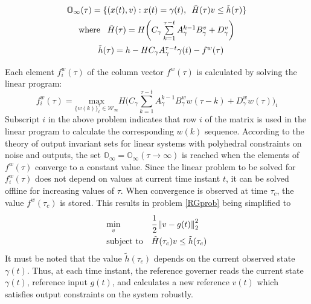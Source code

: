 \documentclass[letterpaper, 10 pt, conference]{ieeeconf}  %
\newcommand{\norm}[1]{\left\lVert#1\right\rVert}
\begin{document}
\begin{enumerate}
\begin{equation*}
	\begin{matrix}
	\mathbb{O}_{\infty}(\tau) = \{(x(t),v): x(t) = \gamma(t), \hspace{5pt} \tilde{H}(\tau)v \leq \tilde{h}(\tau)\} \vspace{5pt}\\
	\text{where } \hspace{5pt} \tilde{H}(\tau) = H\bigg( C_{\gamma}\sum\limits_{k=1}^{\tau - t}A_{\gamma}^{k-1}B^v_{\gamma} + D_{\gamma}^v \bigg) \vspace{5pt} \\ \hspace{10pt}
	\tilde{h}(\tau) = h - HC_{\gamma}A_{\gamma}^{\tau - t}\gamma(t) - f^w(\tau) \vspace{5pt}
	\end{matrix} 
	\end{equation*}
	Each element $f^w_i(\tau)$ of the column vector $f^w(\tau)$ is calculated by solving the linear program:
	\begin{equation}
	f_i^w(\tau) = \underset{\{w(k)\}_{t}^{\tau}\in \mathcal{W}_{\infty}}{\text{max}} H\bigg(C_{\gamma}\sum\limits_{k=1}^{\tau - t}A_{\gamma}^{k-1}B^w_{\gamma}w(\tau-k) + D_{\gamma}^w w(\tau)\bigg)_i
	\label{RG_offline}
	\end{equation}
	Subscript $i$ in the above problem indicates that row $i$ of the matrix is used in the linear program to calculate the corresponding $w(k)$ sequence. According to the theory of output invariant sets for linear systems with polyhedral constraints on noise and outputs, the set $\mathbb{O}_{\infty} = \mathbb{O}_{\infty}(\tau \to \infty)$ is reached when the elements of $f^w(\tau)$ converge to a constant value. Since the linear problem to be solved for $f_i^w(\tau)$ does not depend on values at current time instant $t$, it can be solved offline for increasing values of $\tau$. When convergence is observed at time $\tau_c$, the value $f^w(\tau_c)$ is stored. This results in  problem \eqref{RGprob} being simplified to
	\begin{equation}
	\begin{aligned}
	& \underset{v}{\text{min}}
	& & \cfrac{1}{2}\norm{v-g(t)}_2^2 \\
	& \text{subject to}
	& & 
	\tilde{H}(\tau_c)v \leq \tilde{h}(\tau_c)
	\end{aligned}
	\label{RGprob_simple}
	\end{equation}
	It must be noted that the value $\tilde{h}(\tau_c)$ depends on the current observed state $\gamma(t)$. Thus, at each time instant, the reference governer reads the current state $\gamma(t)$, reference input $g(t)$, and calculates a new reference $v(t)$ which satisfies output constraints on the system robustly.
	

\end{enumerate}
\end{document}
